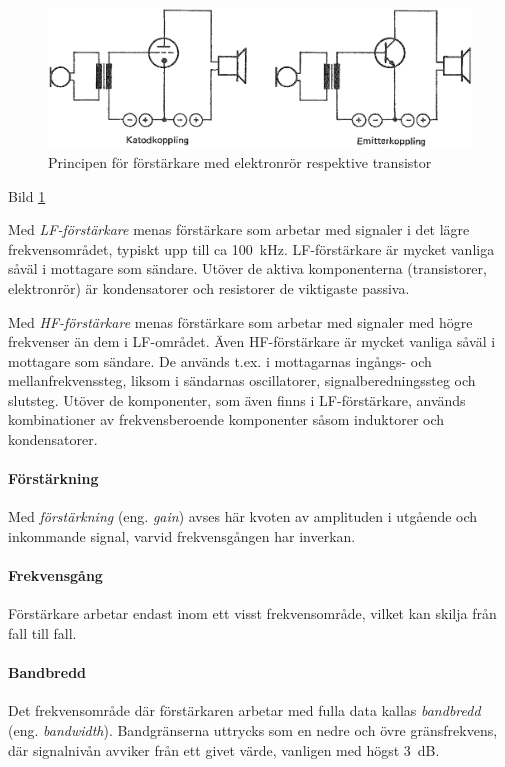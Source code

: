 \begin{figure}
\includegraphics[width=\textwidth]{images/cropped_pdfs/bild_2_3-41.pdf}
\caption{Principen för förstärkare med elektronrör respektive transistor}
\label{fig:BildII3-41}
\end{figure}

Bild \ref{fig:BildII3-41}

Med \emph{LF-förstärkare} menas förstärkare som arbetar med signaler i
det lägre frekvensområdet, typiskt upp till ca 100~kHz.
LF-förstärkare är mycket vanliga såväl i mottagare som
sändare. Utöver de aktiva komponenterna (transistorer, elektronrör)
är kondensatorer och resistorer de viktigaste passiva.

Med \emph{HF-förstärkare} menas förstärkare som arbetar med signaler
med högre frekvenser än dem i LF-området. Även HF-förstärkare är
mycket vanliga såväl i mottagare som sändare. De används t.ex. i
mottagarnas ingångs- och mellanfrekvenssteg, liksom i sändarnas
oscillatorer, signalberedningssteg och slutsteg. Utöver de
komponenter, som även finns i LF-förstärkare, används kombinationer av
frekvensberoende komponenter såsom induktorer och kondensatorer.

\paragraph{Förstärkning}
Med \emph{förstärkning} (eng. \emph{gain}) avses här kvoten av amplituden i utgående och
inkommande signal, varvid frekvensgången har inverkan.

\paragraph{Frekvensgång}
Förstärkare arbetar endast inom ett visst frekvensområde, vilket kan
skilja från fall till fall.

\paragraph{Bandbredd}
Det frekvensområde där förstärkaren arbetar med fulla data kallas
\emph{bandbredd} (eng. \emph{bandwidth}). Bandgränserna uttrycks som en nedre
och övre gränsfrekvens, där signalnivån avviker från ett givet värde, vanligen
med högst 3~dB.

